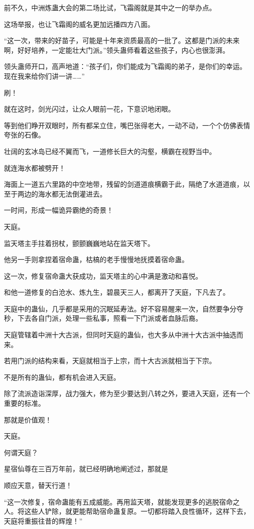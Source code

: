 \begin{this_body}
前不久，中洲炼蛊大会的第二场比试，飞霜阁就是其中之一的举办点。

这场举报，也让飞霜阁的威名更加远播四方八面。

“这一次，带来的好苗子，可能是十年来资质最高的一批了。这都是门派的未来啊，好好培养，一定能壮大门派。”领头蛊师看着这些孩子，内心也很澎湃。

领头蛊师开口，高声地道：“孩子们，你们能成为飞霜阁的弟子，是你们的幸运。现在我来给你们讲一讲……”

刷！

就在这时，剑光闪过，让众人眼前一花，下意识地闭眼。

等到他们睁开双眼时，所有都呆立住，嘴巴张得老大，一动不动，一个个仿佛表情夸张的石像。

壮阔的玄冰岛已经不翼而飞，一道修长巨大的沟壑，横霸在视野当中。

就连海水都被劈开！

海面上一道五六里路的中空地带，残留的剑道道痕横霸于此，隔绝了水道道痕，以至于两边的海水都无法倒灌进去。

一时间，形成一幅诡异霸绝的奇景！

天庭。

监天塔主手拄着拐杖，颤颤巍巍地站在监天塔下。

他另一手则拿捏着宿命蛊，枯槁的老手慢慢地抚摸着宿命蛊。

这一次，修复宿命蛊大获成功，监天塔主的心中满是激动和喜悦。

和他一道修复的白沧水、炼九生，碧晨天三人，都离开了天庭，下凡去了。

天庭中的蛊仙，几乎都是采用的沉眠延寿法。好不容易醒来一次，自然要争分夺秒，下去各自门派，处理一些私事，照看一下门派或者血脉后裔。

天庭管辖着中洲十大古派，但同时天庭的蛊仙，也大多从中洲十大古派中抽选而来。

若用门派的结构来看，天庭就相当于上宗，而十大古派就相当于下宗。

不是所有的蛊仙，都有机会进入天庭。

除了流派造诣深厚，战力强大，修为至少要达到八转之外，要进入天庭，还有一个重要的标准。

那就是价值观！

天庭。

何谓天庭？

星宿仙尊在三百万年前，就已经明确地阐述过，那就是

顺应天意，替天行道！

“这一次修复，宿命蛊能有五成威能。再用监天塔，就能发现更多的逃脱宿命之人。将这些人铲除，就更能帮助宿命蛊复原。一切都将踏入良性循环，这样下去，天庭将重振往昔的辉煌！”


\end{this_body}
